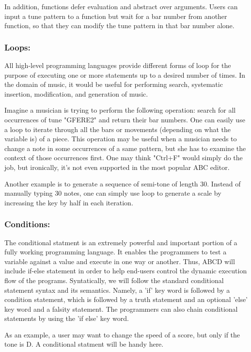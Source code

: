      In addition, functions defer evaluation and abstract over arguments. Users can input a tune pattern to a function but wait for a bar number from another function, so that they can modify the tune pattern in that bar number alone.  

    \subsubsection{Loops:}
    All high-level programming languages provide different forms of loop for the purpose of executing one or more statements up to a desired number of times. In the domain of music, it would be useful for performing search, systematic insertion, modification, and generation of music. 

    Imagine a musician is trying to perform the following operation: search for all occurrences of tune "GFERE2" and return their bar numbers. One can easily use a loop to iterate through all the bars or movements (depending on what the variable is) of a piece. This operation may be useful when a musician needs to change a note in some occurrences of a same pattern, but she has to examine the context of those occurrences first. One may think "Ctrl+F" would simply do the job, but ironically, it's not even supported in the most popular ABC editor\cite{SlashdotMedia17}.  

    Another example is to generate a sequence of semi-tone of length 30. Instead of manually typing 30 notes, one can simply use loop to generate a scale by increasing the key by half in each iteration.

    \subsubsection{Conditions:}
        The conditional statment is an extremely powerful and important portion of a fully working programming language. It enables the programmers to test a variable against a value and execute in one way or another. Thus, ABCD will include if-else statement in order to help end-users control the dynamic execution flow of the programs. Syntatically, we will follow the standard conditional statement syntax and its semantics. Namely, a 'if' key word is followed by a condition statement, which is followed by a truth statement and an optional 'else' key word and a falsity statement. The programmers can also chain conditional statements by using the 'if else' key word.

        As an example, a user may want to change the speed of a score, but only if the tone is D. A conditional statment will be handy here.

